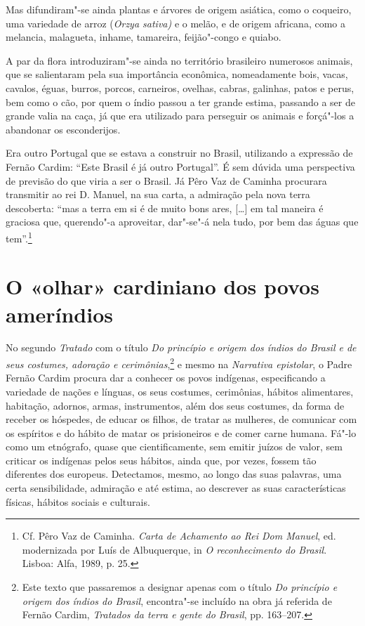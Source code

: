 Mas difundiram"-se ainda plantas e árvores de origem asiática, como o
coqueiro, uma variedade de arroz (\textit{Orzya sativa)} e o melão, e de
origem africana, como a melancia, malagueta, inhame, tamareira,
feijão"-congo e quiabo.

A par da flora introduziram"-se ainda no território brasileiro
numerosos animais, que se salientaram pela sua importância econômica,
nomeadamente bois, vacas, cavalos, éguas, burros, porcos, carneiros,
ovelhas, cabras, galinhas, patos e perus, bem como o cão, por quem o
índio passou a ter grande estima, passando a ser de grande valia na
caça, já que era utilizado para perseguir os animais e forçá"-los a
abandonar os esconderijos.

Era outro Portugal que se estava a construir no Brasil, utilizando a
expressão de Fernão Cardim: ``Este Brasil é já outro Portugal''. 
É sem dúvida uma perspectiva de previsão do que viria a ser o Brasil.
Já Pêro Vaz de Caminha procurara transmitir ao rei D. Manuel, na sua
carta, a admiração pela nova terra descoberta: ``mas a
terra em si é de muito bons ares, [\ldots{}] em tal maneira é graciosa que,
querendo"-a aproveitar, dar"-se"-á nela tudo, por bem das águas que
tem''.\footnote{ Cf. Pêro Vaz de Caminha. \textit{Carta de
Achamento ao Rei Dom Manuel}, ed. modernizada por Luís de Albuquerque,
in \textit{O reconhecimento do Brasil}. Lisboa: Alfa, 1989, p. 25.} 

\section*{O «olhar» cardiniano dos povos ameríndios} 

 No segundo \textit{Tratado} com o título \textit{Do
princípio e origem dos índios do Brasil e de seus costumes, adoração e
cerimônias},\footnote{ Este texto que passaremos a designar apenas
com o título \textit{Do princípio e origem dos índios do Brasil}, 
encontra"-se incluído na obra já referida de Fernão Cardim,
\textit{Tratados da terra e gente do Brasil}, pp. 163--207.} e mesmo na
\textit{Narrativa epistolar}, o Padre Fernão Cardim procura dar a
conhecer os povos indígenas, especificando a variedade de nações e
línguas, os seus costumes, cerimônias, hábitos alimentares, habitação,
adornos, armas, instrumentos, além dos seus costumes, da forma
de receber os hóspedes, de educar os filhos, de tratar as mulheres, de
comunicar com os espíritos e do hábito de matar os prisioneiros e de
comer carne humana. Fá"-lo como um etnógrafo, quase que
cientificamente, sem emitir juízos de valor, sem criticar os indígenas
pelos seus hábitos, ainda que, por vezes, fossem tão diferentes dos
europeus. Detectamos, mesmo, ao longo das suas palavras, uma certa
sensibilidade, admiração e até estima, ao descrever as suas
características físicas, hábitos sociais e culturais.

